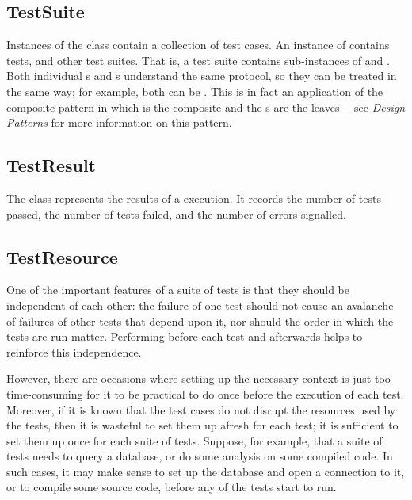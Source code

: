 \documentclass[a4paper,10pt,twoside]{book}
\begin{document}
\subsection{TestSuite}

Instances of the class  contain a collection of test cases.  An
instance of  contains tests, and other test suites.
That is, a test suite contains sub-instances of
 and .
Both individual s and s understand the same protocol, so they can be treated in the same way; for example, both can be .
This is in fact an application of the composite
pattern in which  is the composite and the
s are the leaves\,---\,see \textit{Design Patterns} for more information on this pattern\cite{Gamm95a}.
\subsection{TestResult}

The class  represents the results of a
 execution.  It records the number of tests passed,
the number of tests failed, and the number of errors signalled.

\subsection{TestResource}

One of the important  features of a suite of tests is that they should be independent of each other: the failure of one test should not cause an avalanche of failures of other tests that depend upon it, nor should the order in which the tests are run matter.
Performing  before each test and  afterwards helps to reinforce this independence. 

However, there are occasions where setting up the necessary context is just too time-consuming for it to be practical to do once before the execution of each test.
Moreover, if it is known that the test cases do not disrupt the resources used by the tests, then it is wasteful to set them up afresh for each test; it is sufficient to set them up once for each suite of tests.
Suppose, for example, that a suite of tests needs to query a database, or do some analysis on some compiled code.
In such cases, it may make sense to set up the database and open a connection to it, or to compile some source code, before any of the tests start to run.
\end{document}
